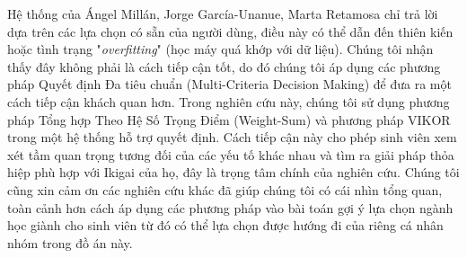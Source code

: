 Hệ thống của Ángel Millán, Jorge García-Unanue, Marta Retamosa chỉ trả lời dựa trên các lựa chọn có sẵn của người dùng, điều này có thể dẫn đến thiên kiến hoặc tình trạng "\textit{overfitting}" (học máy quá khớp với dữ liệu). Chúng tôi nhận thấy đây không phải là cách tiếp cận tốt, do đó chúng tôi áp dụng các phương pháp Quyết định Đa tiêu chuẩn (Multi-Criteria Decision Making) để đưa ra một cách tiếp cận khách quan hơn. Trong nghiên cứu này, chúng tôi sử dụng phương pháp Tổng hợp Theo Hệ Số Trọng Điểm (Weight-Sum) và phương pháp VIKOR trong một hệ thống hỗ trợ quyết định. Cách tiếp cận này cho phép sinh viên xem xét tầm quan trọng tương đối của các yếu tố khác nhau và tìm ra giải pháp thỏa hiệp phù hợp với Ikigai của họ, đây là trọng tâm chính của nghiên cứu. Chúng tôi cũng xin cảm ơn các nghiên cứu khác đã giúp chúng tôi có cái nhìn tổng quan, toàn cảnh hơn cách áp dụng các phương pháp vào bài toán gợi ý lựa chọn ngành học giành cho sinh viên từ đó có thể lựa chọn được hướng đi của riêng cá nhân nhóm trong đồ án này.